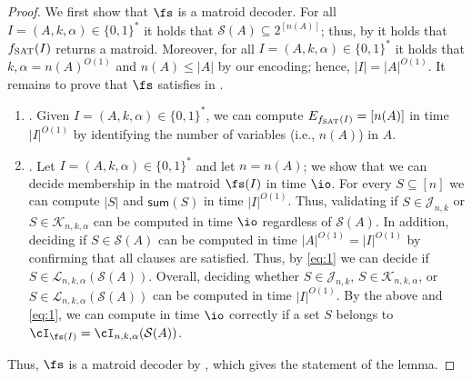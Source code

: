 	\begin{proof} %
		We first show that $\fs$ is a matroid decoder. %
		For all $I = (A,k,\alpha) \in \{0,1\}^*$  it holds that $\mathcal{S}(A) \subseteq 2^{\left[n(A)\right]}$; thus, by  it holds that $f_{\textnormal{SAT}}(I)$ returns a matroid. Moreover, for all $I = (A,k,\alpha) \in \{0,1\}^*$ it holds that $k,\alpha = {n(A)}^{O(1)}$ and $n(A) \leq |A|$ by our encoding; hence, $|I| = |A|^{O(1)}$.  It remains to prove that $\fs$ satisfies  in .
		\begin{enumerate}
			\item  	{}. Given $I = (A,k,\alpha) \in \{0,1\}^*$, we can compute $E_{f_{\textnormal{SAT}}(I)} = \left[n(A)\right]$ in time $|I|^{O(1)}$ by identifying the number of variables (i.e., $n(A)$) in $A$. 
			\item 		{}. Let $I = (A,k,\alpha) \in \{0,1\}^*$ and let $n = n(A)$; we show that we can decide membership in the matroid $\fs(I)$ in time $\io$.  %
			For every $S \subseteq \left[n\right]$ we can compute $|S|$ and $\textsf{sum}(S)$ in time $|I|^{O(1)}$. Thus, validating if $S \in \mathcal{J}_{n,k}$ or $S \in \mathcal{K}_{n,k,\alpha}$ can be computed in time $\io$ regardless of $\mathcal{S}(A)$. In addition, %
			deciding if $S \in \mathcal{S}(A)$ can be computed in time $|A|^{O(1)} = |I|^{O(1)}$ by confirming that all clauses are satisfied. Thus, by \eqref{eq:1} we can decide if $S \in \mathcal{L}_{n,k,\alpha}(\mathcal{S}(A))$. Overall, deciding whether $S \in \mathcal{J}_{n,k}$, $S \in \mathcal{K}_{n,k,\alpha}$, or $S \in \mathcal{L}_{n,k,\alpha}(\mathcal{S}(A))$ can be computed in time $|I|^{O(1)}$. By the above and \eqref{eq:1}, we can compute in time $\io$ correctly if a set $S$ belongs to $\cI_{\fs (I)} = \cI_{n,k,\alpha}(\mathcal{S}(A))$. 
		\end{enumerate}
		Thus, $\fs$ is a matroid decoder by , which gives the statement of the lemma.  %
	\end{proof} 
	
